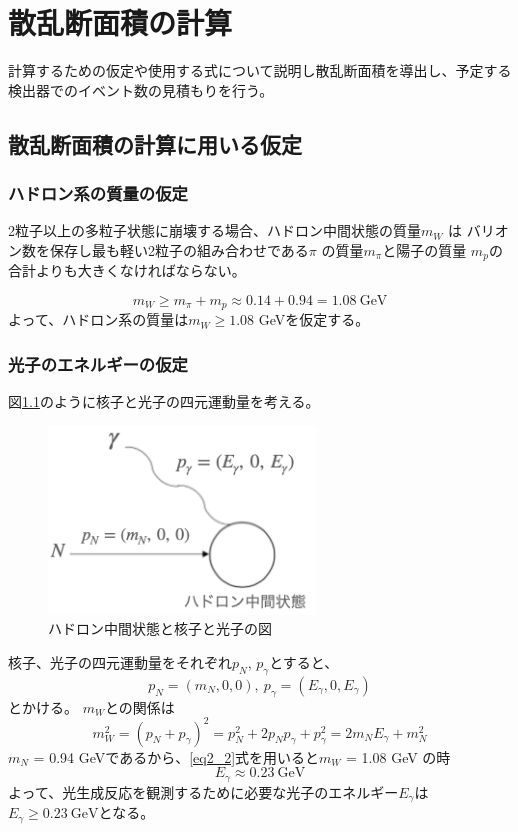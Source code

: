 \chapter{散乱断面積の計算} \label{cha:cross_section}
計算するための仮定や使用する式について説明し散乱断面積を導出し、予定する検出器でのイベント数の見積もりを行う。

\section{散乱断面積の計算に用いる仮定}
\subsection{ハドロン系の質量の仮定}
2粒子以上の多粒子状態に崩壊する場合、ハドロン中間状態の質量$m_W$ は バリオン数を保存し最も軽い2粒子の組み合わせである$\pi$ の質量$m_\pi$と陽子の質量 $m_p$の合計よりも大きくなければならない。

\begin{equation}
    m_W \geq m_\pi + m_p \approx 0.14 + 0.94 = 1.08 \ \mathrm{GeV}
\end{equation}
よって、ハドロン系の質量は$m_W \geq 1.08$ GeVを仮定する。

\subsection{光子のエネルギーの仮定}
図\ref{fig:sigma1}のように核子と光子の四元運動量を考える。
\begin{figure}[H]
    \centering
    \includegraphics[height=5cm]{img/diagram_momentum.png}
    \caption{ハドロン中間状態と核子と光子の図}
    \label{fig:sigma1}
\end{figure}
核子、光子の四元運動量をそれぞれ$p_N$, $p_\gamma$とすると、
\begin{equation}
    p_N = (m_N, 0, 0),\  p_\gamma = (E_\gamma, 0,  E_\gamma)
\end{equation}
とかける。
$m_W$との関係は
\begin{equation}
    \label{eq2_2}
    m_W^2 = (p_N + p_\gamma)^2 = p_N^2 + 2p_N p_\gamma + p_\gamma^2
    = 2m_N E_\gamma + m_N^2
\end{equation}
$m_N$ = 0.94 GeVであるから、\ref{eq2_2}式を用いると$m_W$ = 1.08 GeV の時
\begin{equation}
    E_\gamma \approx 0.23 \ \mathrm{GeV}
\end{equation}
よって、光生成反応を観測するために必要な光子のエネルギー$E_\gamma$は
$E_\gamma \geq 0.23 \ \mathrm{GeV}$となる。


